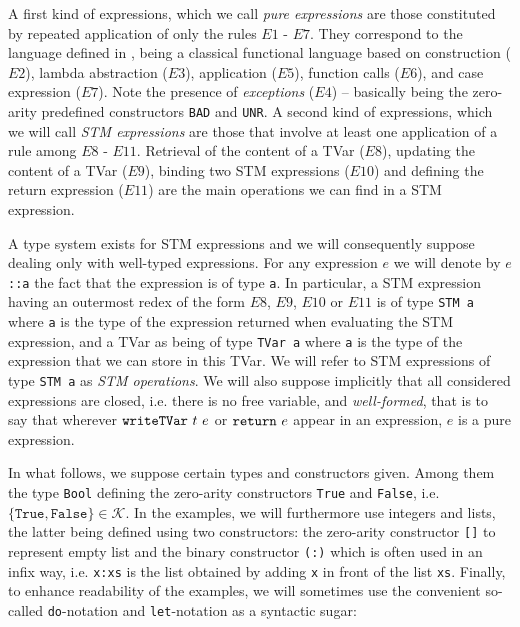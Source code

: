 \documentclass[submission,copyright,creativecommons]{eptcs}
\newcommand{\code}[1]{\textrm{{\tt #1}}}
\newcommand{\writeTVarONLY}{\ensuremath{\code{writeTVar}}}
\newcommand{\writeTVar}[2]{\ensuremath{\writeTVarONLY \ #1 \ #2}}
\newcommand{\returnTMONLY}{\ensuremath{\code{return}}}
\newcommand{\returnTM}[1]{\ensuremath{\returnTMONLY \ #1}}
\begin{document}
A first kind of expressions, which we call \emph{pure expressions} are those constituted by repeated application of only the rules $E1$ - $E7$. They correspond to the language defined in \cite{static-contract-checking}, being a classical functional language based on construction ($E2$), lambda abstraction ($E3$), application ($E5$), function calls ($E6$), and case expression ($E7$). Note the presence of \emph{exceptions} ($E4$) -- basically being the zero-arity predefined constructors \texttt{BAD} and \texttt{UNR}.
A second kind of expressions, which we will call \emph{STM expressions} are those that involve at least one application of a rule among $E8$ - $E11$. 
Retrieval of the content of a TVar ($E8$), updating the content of a TVar ($E9$), binding two STM expressions ($E10$) and defining the return expression ($E11$) are the main operations we can find in a STM expression. 



A type system exists for 
STM expressions \cite{compositional-theory-stm} and we will consequently suppose dealing only with well-typed expressions. 
For any expression $e$ we will denote by $e$\texttt{::a} the fact that the expression is of type \texttt{a}. 
In particular, a STM expression having an outermost redex of the form $E8$, $E9$, $E10$ or $E11$ is of type \texttt{STM a} where \texttt{a} is the type of the expression returned when evaluating the STM expression, and a TVar as being of type \texttt{TVar a} where \texttt{a} is the type of the expression that we can store in this TVar. We will refer to STM expressions of type \texttt{STM a} as \emph{STM operations}. 
We will also suppose implicitly that all considered expressions are closed, i.e. there is no free variable, and \emph{well-formed}, that is to say that wherever $\writeTVar{t}{e}$ or $\returnTM{e}$ appear in an expression, $e$ is a pure expression.

In what follows, we suppose certain types and constructors given. Among them the type \texttt{Bool} defining the zero-arity constructors \texttt{True} and \texttt{False}, i.e.  $\{\mathtt{True},\mathtt{False}\}\in \mathcal{K}$. In the examples, we will furthermore use integers and lists, the latter being defined using two constructors: the zero-arity constructor \texttt{[]} to represent empty list and the binary constructor \texttt{(:)} which is often used in an infix way, i.e. \texttt{x:xs} is the list obtained by adding \texttt{x} in front of the list \texttt{xs}. Finally, to enhance readability of the examples, we will sometimes use the convenient so-called \texttt{do}-notation \cite{composable-memory-transactions} and \texttt{let}-notation as a syntactic sugar:
\end{document}

